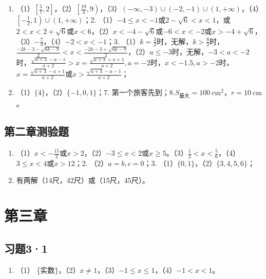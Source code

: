 \begin{enumerate}
\item
  （1）\(\left[\frac{5}{7}, 2\right]\)，（2）\(\left[\frac{19}{3}, 9\right)\)，（3）\((- \infty, -3) \cup (-2, -1) \cup (1, +\infty)\)，（4）\(\left[-\frac{1}{2}, 1\right) \cup (1, +\infty)\)；2.
  （1）\(-4 \leqslant x < -1\)或\(2 - \sqrt{6} < x < 1\)，或\(2 < x < 2 + \sqrt{6}\)或\(x < 6\)，（2）\(x < -4 - \sqrt{6}\)或\(-6 < x < -2\)或\(x > -4 + \sqrt{6}\)，（3）\(-\frac{7}{9}\)，（4）\(-2 < x < -1\)；3.
  （1）\(k = \frac{3}{2}\)时，无解，\(k > \frac{8}{2}\)时，\(\frac{-2k - 3 - \sqrt{6k - 9}}{2} < x < \frac{-2k - 3 + \sqrt{6k - 9}}{2}\)，（2）\(a \leqslant -3\)时，无解，\(-3 < a < -2\)时，\(\frac{\sqrt{a + 3} - a - 1}{a + 2} > x = \frac{\sqrt{a + 3} + a + 1}{a + 2}, a = -2\)时，\(x < -1.5, a > -2\)时，\(x = \frac{\sqrt{a + 3} - a + 1}{a + 2}\)或\(x > \frac{\sqrt{a + 3} - a - 1}{a + 2}\)；
\item
  （1）\(\{4\}\)，（2）\(\{-1, 0, 1\}\)；7.
  第一个旅客先到；8.\(S_{\text{最大}} = 100 \mathrm{~cm}^{2}\)，\(r = 10 \mathrm{~cm}\)。
\end{enumerate}

\subsection{第二章测验题}

\begin{enumerate}
\item
  （1）\(x < -\frac{15}{2}\)或\(x > 2\)，（2）\(-3 \leqslant x < 2\)或\(x \geqslant 5\)。（3）\(\frac{1}{2} < x < \frac{5}{6}\)，（4）\(3 \leqslant x < 4\)或\(x > 12\)；2.
  （2）\(a = b, c = 0\)；3. （1）\(\{0, 1\}\)，（2）\(\{3, 4, 5, 6\}\)；
\item
  有两解（14尺，42尺）或（15尺，45尺）。
\end{enumerate}

\section{第三章}

\subsection{习题3·1}

\begin{enumerate}[start=3]
\item
  （1）
  \{实数\}，（2）\(x \neq 1\)，（3）\(-1 \leqslant x \leqslant 1\)，（4）\(-1 < x < 1\)。
\end{enumerate}

